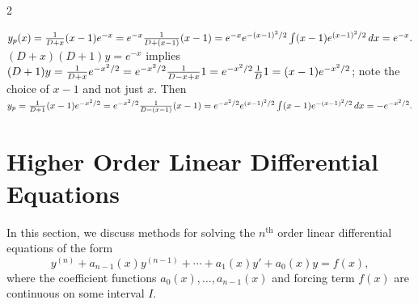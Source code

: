 \begin{multicols}{2}
\begin{Answer}[ref={EX33}]
\begin{tasks}
	\(y_p(x) =\frac{1}{D+x}(x-1)e^{-x} = e^{-x}\frac{1}{D+(x-1)}(x-1)\\ = e^{-x}e^{-(x-1)^2/2}\\ \int (x-1)e^{(x-1)^2/2}\, dx =e^{-x}.\)
	\task \((D+x)(D+1)y= e^{-x}\) implies\\ \((D+1)y =\frac{1}{D+x}e^{-x^2/2}\\ = e^{-x^2/2}\frac{1}{D-x+x}1=e^{-x^2/2}\frac{1}{D}1= (x-1)e^{-x^2/2}\); note the choice of $x-1$  and not just $x.$
	Then \(y_p= \frac{1}{D+1}(x-1)e^{-x^2/2} = e^{-x^2/2}\frac{1}{D-(x-1)}(x-1)\\=e^{-x^2/2}e^{(x-1)^2/2}\\\int(x-1)e^{-(x-1)^2/2}\, dx= -e^{-x^2/2}.\)
	
\end{tasks}

	\end{Answer}
\end{multicols}




\section{Higher Order Linear Differential Equations}\label{sec:higher order DEs}

In this section, we discuss  methods for solving the $n^\text{th}$ order linear differential equations of the form
	\begin{equation} \label{eq:nonhomogeneous2}
	y^{(n)} + a_{n-1}(x)y^{(n-1)} + \cdots + a_1(x)y' + a_0(x)y = f(x),
\end{equation}
where  the coefficient functions \( a_0(x), \dots, a_{n-1}(x) \) and  forcing term \( f(x) \) are continuous on some interval \( I .\)

